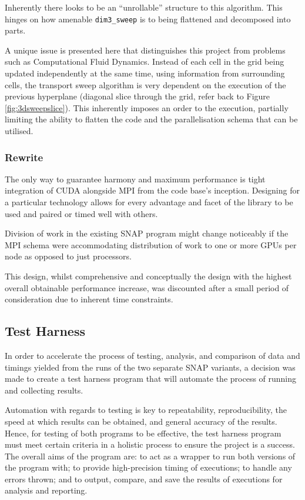 \documentclass[conference]{IEEEtran}
\begin{document}
Inherently there looks to be an ``unrollable'' structure to this algorithm. This hinges on how amenable \texttt{dim3\_sweep} is to being flattened and decomposed into parts.

A unique issue is presented here that distinguishes this project from problems such as Computational Fluid Dynamics. Instead of each cell in the grid being updated independently at the same time, using information from surrounding cells, the transport sweep algorithm is very dependent on the execution of the previous hyperplane (diagonal slice through the grid, refer back to Figure \ref{fig:3dsweepslice}). This inherently imposes an order to the execution, partially limiting the ability to flatten the code and the parallelisation schema that can be utilised.

\subsubsection{Rewrite}

The only way to guarantee harmony and maximum performance is tight integration of CUDA alongside MPI from the code base's inception. Designing for a particular technology allows for every advantage and facet of the library to be used and paired or timed well with others.

Division of work in the existing SNAP program might change noticeably if the MPI schema were accommodating distribution of work to one or more GPUs per node as opposed to just processors.

This design, whilst comprehensive and conceptually the design with the highest overall obtainable performance increase, was discounted after a small period of consideration due to inherent time constraints.


\subsection{Test Harness}

In order to accelerate the process of testing, analysis, and comparison of data and timings yielded from the runs of the two separate SNAP variants, a decision was made to create a test harness program that will automate the process of running and collecting results.

Automation with regards to testing is key to repeatability, reproducibility, the speed at which results can be obtained, and general accuracy of the results. Hence, for testing of both programs to be effective, the test harness program must meet certain criteria in a holistic process to ensure the project is a success. The overall aims of the program are: to act as a wrapper to run both versions of the program with; to provide high-precision timing of executions; to handle any errors thrown; and to output, compare, and save the results of executions for analysis and reporting.
\end{document}
